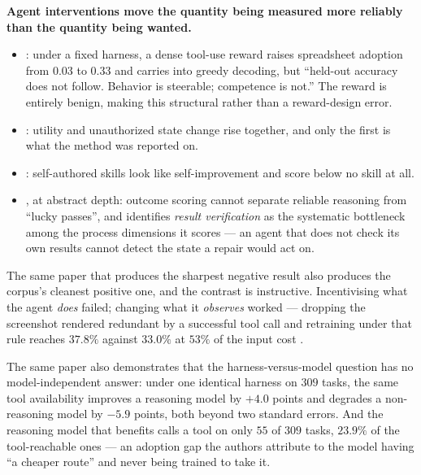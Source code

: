 \documentclass[10pt,twocolumn,a4paper]{article}
\begin{document}
\textbf{Agent interventions move the quantity being measured more reliably than the
quantity being wanted.}

\begin{itemize}
\item \citet{fan2026screenshotstoolselicitingtool}: under a fixed harness, a dense tool-use
      reward raises spreadsheet adoption from $0.03$ to $0.33$ and carries into greedy
      decoding, but ``held-out accuracy does not follow. Behavior is steerable; competence
      is not.''
      The reward is entirely benign, making this structural rather than a reward-design
      error.
\item \citet{li2026auditingselfevolutionfinancialagents}: utility and unauthorized state
      change rise together, and only the first is what the method was reported on.
\item \citet{peng2026writeexecuterefineskill}: self-authored skills look like
      self-improvement and score below no skill at all.
\item \citet{wu2026clawtracktracelevelevaluationimprovement}, at abstract depth: outcome
      scoring cannot separate reliable reasoning from ``lucky passes'', and identifies
      \emph{result verification} as the systematic bottleneck among the process dimensions
      it scores --- an agent that does not check its own results cannot detect the state a
      repair would act on.
\end{itemize}

The same paper that produces the sharpest negative result also produces the corpus's
cleanest positive one, and the contrast is instructive.
Incentivising what the agent \emph{does} failed; changing what it \emph{observes} worked ---
dropping the screenshot rendered redundant by a successful tool call and retraining under
that rule reaches $37.8\%$ against $33.0\%$ at $53\%$ of the input cost
\citep{fan2026screenshotstoolselicitingtool}.

The same paper also demonstrates that the harness-versus-model question has no
model-independent answer: under one identical harness on $309$ tasks, the same tool
availability improves a reasoning model by $+4.0$ points and degrades a non-reasoning model
by $-5.9$ points, both beyond two standard errors.
And the reasoning model that benefits calls a tool on only $55$ of $309$ tasks, $23.9\%$ of
the tool-reachable ones --- an adoption gap the authors attribute to the model having ``a
cheaper route'' and never being trained to take it.
\end{document}
